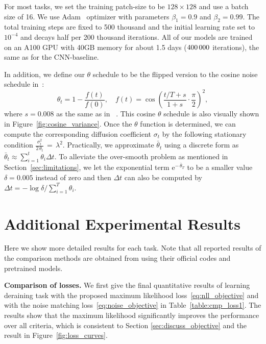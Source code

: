 \documentclass{article}
\newcommand{\expp}{\mathrm{e}}
\theoremstyle{plain}
\theoremstyle{definition}
\theoremstyle{remark}
\begin{document}
For most tasks, we set the training patch-size to be $128 \times 128$ and use a batch size of 16. We use Adam~\cite{kingma2014adam} optimizer with parameters $\beta_1 = 0.9$ and $\beta_2=0.99$. The total training steps are fixed to 500 thousand and the initial learning rate set to $10^{-4}$ and decays half per 200 thousand iterations. All of our models are trained on an A100 GPU with 40GB memory for about 1.5 days ($400\thinspace000$ iterations), the same as for the CNN-baseline.

In addition, we define our $\theta$ schedule to be the flipped version to the cosine noise schedule in~\cite{nichol2021improved}:
\begin{equation}
    \theta_t = 1 - \frac{f(t)}{f(0)}, \quad f(t) = \cos \left( \frac{t/T + s}{1 + s} \cdot \frac{\pi}{2} \right)^2,
\end{equation}
where $s=0.008$ as the same as in ~\cite{nichol2021improved}. This cosine $\theta$ schedule is also visually shown in Figure~\ref{fig:cosine_variance}. Once the $\theta$ function is determined, we can compute the corresponding diffusion coefficient $\sigma_t$ by the following stationary condition $\frac{\sigma_t^2}{2 \, \theta_t} \,  = \, \lambda^2$.
Practically, we approximate $\bar{\theta}_t$ using a discrete form as $\bar{\theta}_t \approx \sum_{i=1}^t \theta_i \Delta t$. To alleviate the over-smooth problem as mentioned in Section~\ref{sec:limitations}, we let the exponential term $\expp^{- \, \bar{\theta}_T}$ to be a smaller value $\delta=0.005$ instead of zero and then $\Delta t$ can also be computed by $\Delta t = -\log \delta / \sum_{i=1}^T \theta_i$. 


\section{Additional Experimental Results}
\label{app-sec:results}

Here we show more detailed results for each task. Note that all reported results of the comparison methods are obtained from using their official codes and pretrained models.

\textbf{Comparison of losses.}
We first give the final quantitative results of learning deraining task with the proposed maximum likelihood loss~\eqref{eq:nll_objective} and with the noise matching loss~\eqref{eq:noise_objective} in Table~\ref{table:cmp_loss1}. The results show that the maximum likelihood significantly improves the performance over all criteria, which is consistent to Section \ref{sec:discuss_objective} and the result in Figure~\ref{fig:loss_curves}. 
\end{document}
